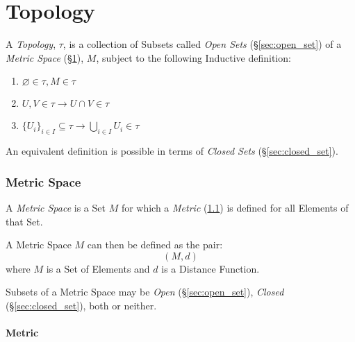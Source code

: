 \part{Topology}\label{sec:topology}\cite{lc11}

A \emph{Topology}, $\tau$, is a collection of Subsets called
\emph{Open Sets} (\S\ref{sec:open_set}) of a \emph{Metric Space}
(\S\ref{sec:metric_space}), $M$, subject to the following Inductive
definition:
\begin{enumerate}
\item $\varnothing \in \tau, M \in \tau$
\item $U,V \in \tau \rightarrow U \cap V \in \tau$
\item $\{U_i\}_{i \in I} \subseteq \tau \rightarrow \bigcup_{i \in I}
  U_i \in \tau$
\end{enumerate}

An equivalent definition is possible in terms of \emph{Closed Sets}
(\S\ref{sec:closed_set}).



\section{Metric Space}\label{sec:metric_space}

A \emph{Metric Space} is a Set $M$ for which a \emph{Metric}
(\ref{sec:metric}) is defined for all Elements of that Set.

A Metric Space $M$ can then be defined as the pair:
\[
    (M,d)
\]
where $M$ is a Set of Elements and $d$ is a Distance Function.

Subsets of a Metric Space may be \emph{Open}
(\S\ref{sec:open_set}), \emph{Closed} (\S\ref{sec:closed_set}),
both or neither.



\subsection{Metric}\label{sec:metric}


